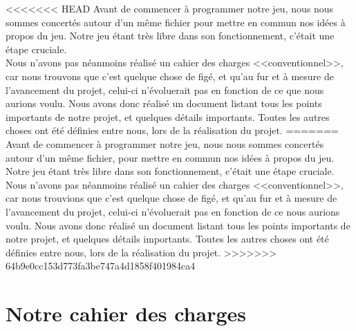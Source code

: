 \documentclass[11pt]{report}
\begin{document}
<<<<<<< HEAD
	Avant de commencer à programmer notre jeu, nous nous sommes concertés autour d'un même fichier pour mettre en commun nos idées à propos du jeu. Notre jeu étant très libre dans son fonctionnement, c'était une étape cruciale.\\
	Nous n'avons pas néanmoins réalisé un cahier des charges <<conventionnel>>, car nous trouvons que c'est quelque chose de figé, et qu'au fur et à mesure de l'avancement du projet, celui-ci n'évoluerait pas en fonction de ce que nous aurions voulu. Nous avons donc réalisé un document listant tous les points importants de notre projet, et quelques détails importants. Toutes les autres choses ont été définies entre nous, lors de la réalisation du projet.
=======
	Avant de commencer à programmer notre jeu, nous nous sommes concertés autour d'un même fichier, pour mettre en commun nos idées à propos du jeu. Notre jeu étant très libre dans son fonctionnement, c'était une étape cruciale.\\
	Nous n'avons pas néanmoins réalisé un cahier des charges <<conventionnel>>, car nous trouvions que c'est quelque chose de figé, et qu'au fur et à mesure de l'avancement du projet, celui-ci n'évoluerait pas en fonction de ce nous aurions voulu. Nous avons donc réalisé un document listant tous les points importants de notre projet, et quelques détails importants. Toutes les autres choses ont été définies entre nous, lors de la réalisation du projet.
>>>>>>> 64b9e0cc153d773fa3be747a4d1858f401984ca4

	\section{Notre cahier des charges}
\end{document}

